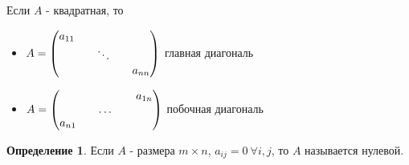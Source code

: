 \documentclass[a4paper, 12pt]{article}
\theoremstyle{definition}
\newtheorem*{definition}{Определение}
\begin{document}
    \newpage
    Если $A$ - квадратная, то
    \begin{itemize}
      \item $ A =\begin{pmatrix}
        a_{11} && \null && \null \\
        \null && \ddots && \null \\
        \null && \null && a_{nn} 
      \end{pmatrix} $ главная диагональ
      \item $ A =
      \begin{pmatrix}
        \null && \null && a_{1n} \\
        \null && \dots && \null \\
        a_{n1}  && \null && \null
      \end{pmatrix} $ побочная диагональ
    \end{itemize}
    
    \begin{definition}
      Если $A$ - размера $m\times n$, $a_{ij} = 0\ \forall i,j$, то $A$ называется нулевой.
    \end{definition}
\end{document}
